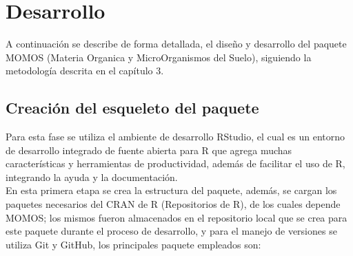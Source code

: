 \chapter{Desarrollo}

A continuaci\'on se describe de forma detallada, el dise\~no y desarrollo del paquete MOMOS (Materia Organica y MicroOrganismos del Suelo), siguiendo la metodolog\'ia descrita en el cap\'itulo 3.

\section{Creaci\'on del esqueleto del paquete}

Para esta fase se utiliza el ambiente de desarrollo RStudio, el cual es un entorno de desarrollo integrado de fuente abierta para R que agrega muchas caracter\'isticas y herramientas de productividad, adem\'as de facilitar el uso de R, integrando la ayuda y la documentaci\'on.\\

En esta primera etapa se crea la estructura del paquete, adem\'as, se cargan los paquetes necesarios del CRAN de R (Repositorios de R), de los cuales depende MOMOS; los mismos fueron almacenados en el repositorio local que se crea para este paquete durante el proceso de desarrollo, y para el manejo de versiones se utiliza Git y GitHub, los principales paquete empleados son:\\

